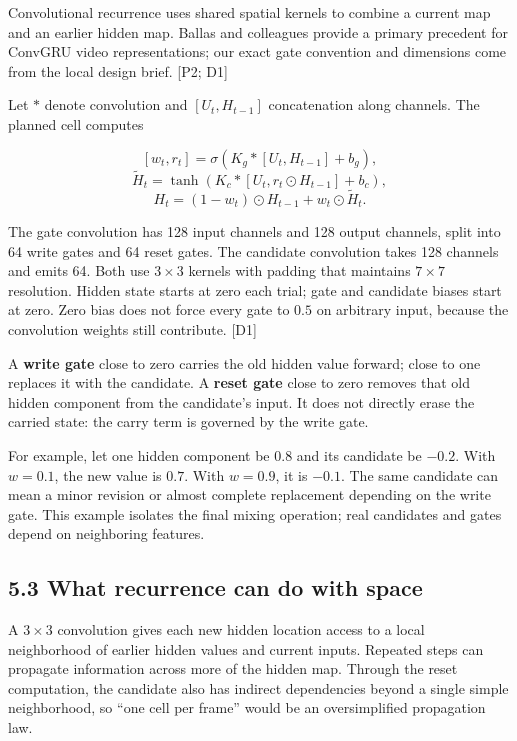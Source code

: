 \documentclass[
  11pt,
]{article}
\let\oldsubsection\subsection
\renewcommand{\subsection}{\Needspace{6\baselineskip}\oldsubsection}
\begin{document}
Convolutional recurrence uses shared spatial kernels to combine a
current map and an earlier hidden map. Ballas and colleagues provide a
primary precedent for ConvGRU video representations; our exact gate
convention and dimensions come from the local design brief. {[}P2; D1{]}

Let \(*\) denote convolution and \([U_t,H_{t-1}]\) concatenation along
channels. The planned cell computes

\[[w_t,r_t]=\sigma\!\left(K_g*[U_t,H_{t-1}]+b_g\right),\]
\[\widetilde H_t=\tanh\!\left(K_c*[U_t,r_t\odot H_{t-1}]+b_c\right),\]
\[H_t=(1-w_t)\odot H_{t-1}+w_t\odot\widetilde H_t.\]

The gate convolution has 128 input channels and 128 output channels,
split into 64 write gates and 64 reset gates. The candidate convolution
takes 128 channels and emits 64. Both use \(3\times3\) kernels with
padding that maintains \(7\times7\) resolution. Hidden state starts at
zero each trial; gate and candidate biases start at zero. Zero bias does
not force every gate to \(0.5\) on arbitrary input, because the
convolution weights still contribute. {[}D1{]}

A \textbf{write gate} close to zero carries the old hidden value
forward; close to one replaces it with the candidate. A \textbf{reset
gate} close to zero removes that old hidden component from the
candidate's input. It does not directly erase the carried state: the
carry term is governed by the write gate.

For example, let one hidden component be \(0.8\) and its candidate be
\(-0.2\). With \(w=0.1\), the new value is \(0.7\). With \(w=0.9\), it
is \(-0.1\). The same candidate can mean a minor revision or almost
complete replacement depending on the write gate. This example isolates
the final mixing operation; real candidates and gates depend on
neighboring features.

\subsection{5.3 What recurrence can do with
space}\label{what-recurrence-can-do-with-space}

A \(3\times3\) convolution gives each new hidden location access to a
local neighborhood of earlier hidden values and current inputs. Repeated
steps can propagate information across more of the hidden map. Through
the reset computation, the candidate also has indirect dependencies
beyond a single simple neighborhood, so ``one cell per frame'' would be
an oversimplified propagation law.
\end{document}
